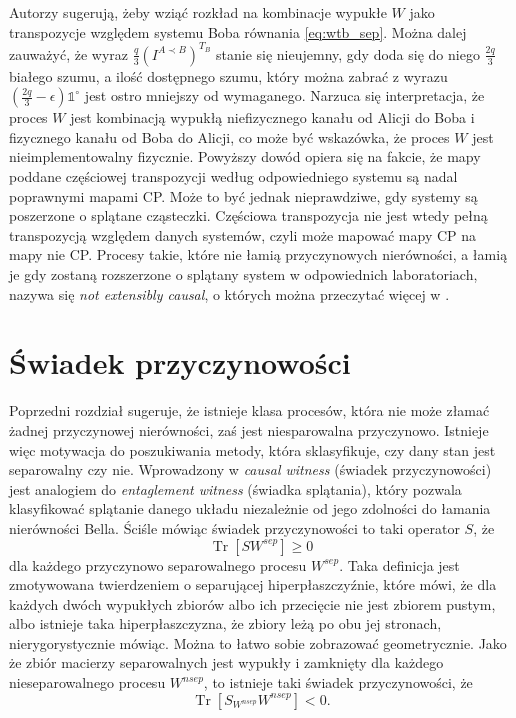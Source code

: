\documentclass[10pt]{article} %
\DeclareMathOperator{\Trs}{Tr}
\newcommand{\IO}{\mathbb{1}^\circ}
\begin{document}
Autorzy \cite{causal_model} sugerują, żeby wziąć rozkład na kombinacje wypukłe $W$ jako transpozycje względem systemu Boba równania \eqref{eq:wtb_sep}. Można dalej zauważyć, że wyraz $\frac{q}{3} \left( I^{A \prec B} \right)^{T_B}$ stanie się nieujemny, gdy doda się do niego $\frac{2q}{3}$ białego szumu,
a ilość dostępnego szumu, który można zabrać z wyrazu $\left( \frac{2q}{3} - \epsilon \right) \IO$ jest ostro mniejszy od wymaganego. Narzuca się interpretacja, że proces $W$ jest kombinacją wypukłą niefizycznego kanału od Alicji do Boba i fizycznego kanału od Boba do Alicji, co może być wskazówka, że proces
$W$ jest nieimplementowalny fizycznie.
Powyższy dowód opiera się na fakcie, że mapy poddane częściowej transpozycji według odpowiedniego systemu są nadal poprawnymi mapami CP.
Może to być jednak nieprawdziwe, gdy systemy są poszerzone o splątane cząsteczki. Częściowa transpozycja nie jest wtedy pełną transpozycją względem danych systemów, czyli może mapować mapy CP na mapy nie CP. Procesy takie, które nie łamią przyczynowych nierówności, a łamią je gdy zostaną rozszerzone o splątany system w odpowiednich laboratoriach, nazywa się \textit{not extensibly causal},
o których można przeczytać więcej w \cite{causal_model}.
\section{Świadek przyczynowości} 
Poprzedni rozdział sugeruje, że istnieje klasa procesów, która nie może złamać żadnej przyczynowej nierówności, zaś jest niesparowalna przyczynowo. Istnieje więc motywacja do poszukiwania metody, która sklasyfikuje, czy dany stan jest separowalny czy nie. Wprowadzony w \cite{causal_witness} \textit{causal witness}
(świadek przyczynowości) jest analogiem do \textit{entaglement witness} (świadka splątania), który pozwala klasyfikować splątanie danego układu niezależnie od jego zdolności do łamania nierówności Bella. Ściśle mówiąc świadek przyczynowości to taki operator $S$, że
\begin{equation}
\label{eq:witness_gez}
\Trs\left[S W^{sep} \right]\geq 0
\end{equation}
dla każdego przyczynowo separowalnego procesu $W^{sep}$. Taka definicja jest zmotywowana twierdzeniem o separującej hiperpłaszczyźnie, które mówi, że dla każdych dwóch wypukłych zbiorów albo ich przecięcie nie jest zbiorem pustym, albo istnieje taka hiperpłaszczyzna, że zbiory leżą po obu jej stronach, nierygorystycznie mówiąc. Można to łatwo sobie zobrazować geometrycznie. Jako że zbiór macierzy separowalnych jest wypukły i zamknięty dla każdego nieseparowalnego procesu $W^{nsep}$, to istnieje taki świadek przyczynowości, że 
\begin{equation}
\Trs \left[ S_{W^{nsep}} W^{nsep} \right] < 0.
\end{equation}
\end{document}
